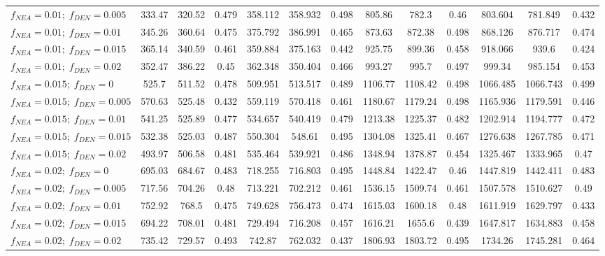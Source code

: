 \begin{tabular}{@{}lcccccccccccc@{}}
$f_{NEA}=0.01 ;\; f_{DEN}=0.005$ & 333.47 & 320.52 & 0.479 & 358.112 & 358.932 & 0.498 & 805.86 & 782.3 & 0.46 & 803.604 & 781.849 & 0.432 \\
$f_{NEA}=0.01 ;\; f_{DEN}=0.01$ & 345.26 & 360.64 & 0.475 & 375.792 & 386.991 & 0.465 & 873.63 & 872.38 & 0.498 & 868.126 & 876.717 & 0.474 \\
$f_{NEA}=0.01 ;\; f_{DEN}=0.015$ & 365.14 & 340.59 & 0.461 & 359.884 & 375.163 & 0.442 & 925.75 & 899.36 & 0.458 & 918.066 & 939.6 & 0.424 \\
$f_{NEA}=0.01 ;\; f_{DEN}=0.02$ & 352.47 & 386.22 & 0.45 & 362.348 & 350.404 & 0.466 & 993.27 & 995.7 & 0.497 & 999.34 & 985.154 & 0.453 \\
$f_{NEA}=0.015 ;\; f_{DEN}=0$ & 525.7 & 511.52 & 0.478 & 509.951 & 513.517 & 0.489 & 1106.77 & 1108.42 & 0.498 & 1066.485 & 1066.743 & 0.499 \\
$f_{NEA}=0.015 ;\; f_{DEN}=0.005$ & 570.63 & 525.48 & 0.432 & 559.119 & 570.418 & 0.461 & 1180.67 & 1179.24 & 0.498 & 1165.936 & 1179.591 & 0.446 \\
$f_{NEA}=0.015 ;\; f_{DEN}=0.01$ & 541.25 & 525.89 & 0.477 & 534.657 & 540.419 & 0.479 & 1213.38 & 1225.37 & 0.482 & 1202.914 & 1194.777 & 0.472 \\
$f_{NEA}=0.015 ;\; f_{DEN}=0.015$ & 532.38 & 525.03 & 0.487 & 550.304 & 548.61 & 0.495 & 1304.08 & 1325.41 & 0.467 & 1276.638 & 1267.785 & 0.471 \\
$f_{NEA}=0.015 ;\; f_{DEN}=0.02$ & 493.97 & 506.58 & 0.481 & 535.464 & 539.921 & 0.486 & 1348.94 & 1378.87 & 0.454 & 1325.467 & 1333.965 & 0.47 \\
$f_{NEA}=0.02 ;\; f_{DEN}=0$ & 695.03 & 684.67 & 0.483 & 718.255 & 716.803 & 0.495 & 1448.84 & 1422.47 & 0.46 & 1447.819 & 1442.411 & 0.483 \\
$f_{NEA}=0.02 ;\; f_{DEN}=0.005$ & 717.56 & 704.26 & 0.48 & 713.221 & 702.212 & 0.461 & 1536.15 & 1509.74 & 0.461 & 1507.578 & 1510.627 & 0.49 \\
$f_{NEA}=0.02 ;\; f_{DEN}=0.01$ & 752.92 & 768.5 & 0.475 & 749.628 & 756.473 & 0.474 & 1615.03 & 1600.18 & 0.48 & 1611.919 & 1629.797 & 0.433 \\
$f_{NEA}=0.02 ;\; f_{DEN}=0.015$ & 694.22 & 708.01 & 0.481 & 729.494 & 716.208 & 0.457 & 1616.21 & 1655.6 & 0.439 & 1647.817 & 1634.883 & 0.458 \\
$f_{NEA}=0.02 ;\; f_{DEN}=0.02$ & 735.42 & 729.57 & 0.493 & 742.87 & 762.032 & 0.437 & 1806.93 & 1803.72 & 0.495 & 1734.26 & 1745.281 & 0.464 \\
\bottomrule
\end{tabular}
